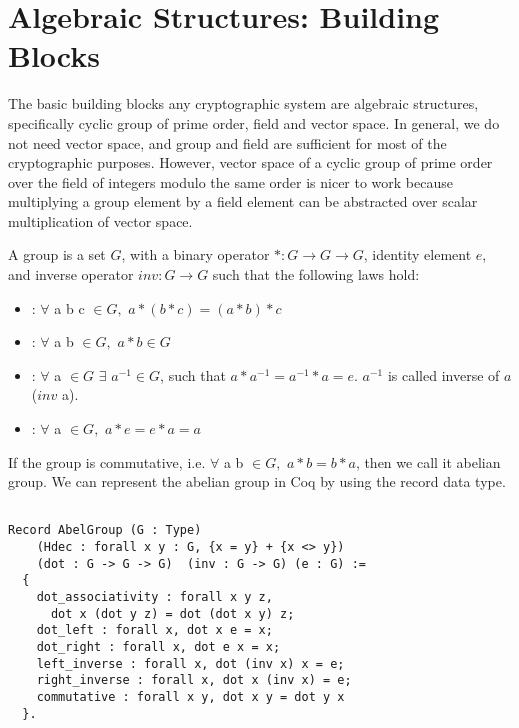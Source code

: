 \section{Algebraic Structures: Building Blocks}
\label{sec:algebra}
The basic building blocks any cryptographic system are algebraic structures, specifically cyclic group of prime order, field and vector space. In general, 
we do not need vector space, and group and field are sufficient for most of the cryptographic purposes. However,
vector space  of a cyclic group of prime order over the field of integers modulo the same order is nicer to work 
because multiplying a group element by a field element can be abstracted over scalar multiplication of vector space.

\begin{definition}[Group] 
A group is a set $G$, with a binary operator $* : G \rightarrow G \rightarrow G$, identity element $e$, and inverse operator $inv : G \rightarrow G$ such 
    that the following laws hold:  \end{definition} 
    \begin{itemize}
     \item {}: $\forall$  a b c $\in G,$  $a * (b * c) = (a * b) * c$
    \item {}: $\forall$ a b $\in G,$  $a * b \in G$
    \item {}: $\forall$ a $\in G$ $\exists$ $a^{-1} \in G$, such that $a * a^{-1} = a^{-1} * a = e$. $a^{-1}$ is called inverse of $a$ ($inv$ a).
    \item {}: $\forall$ a $\in G,$  $a * e = e * a  = a$
    \end{itemize}
  
    \noindent
    If the group is commutative, i.e. $\forall$ a b $\in  G,$  $a * b = b * a$, then we call it abelian group.  We can represent the abelian group in Coq by using the 
    record data type. 
 
 \begin{verbatim}

Record AbelGroup (G : Type) 
    (Hdec : forall x y : G, {x = y} + {x <> y}) 
    (dot : G -> G -> G)  (inv : G -> G) (e : G) :=
  {
    dot_associativity : forall x y z, 
      dot x (dot y z) = dot (dot x y) z;
    dot_left : forall x, dot x e = x;
    dot_right : forall x, dot e x = x;
    left_inverse : forall x, dot (inv x) x = e;
    right_inverse : forall x, dot x (inv x) = e;
    commutative : forall x y, dot x y = dot y x
  }.
  
\end{verbatim}

